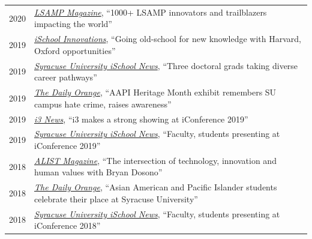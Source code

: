 \documentclass[12pt]{article}
\begin{document}
{\begin{longtable}{R{0.75in}p{5.0in}}
\footnotesize{2020} & \href{https://lsmrce.org/documents/community/LSAMP-Trailblazers-Magazine-2020.pdf}{\textit{LSAMP Magazine}}, ``1000+ LSAMP innovators and trailblazers impacting the world''\\

\footnotesize{2019} & \href{https://web.archive.org/web/20211124225929/https://issuu.com/ischoolsu/docs/su_ischool_innovations_18-19}{\textit{iSchool Innovations}}, ``Going old-school for new knowledge with Harvard, Oxford opportunities''\\

\footnotesize{2019} & \href{https://web.archive.org/web/20240724175744/https://ischool.syr.edu/three-doctoral-grads-taking-diverse-career-pathways-2019/}{\textit{Syracuse University iSchool News}}, ``Three doctoral grads taking diverse career pathways''\\

\footnotesize{2019} & \href{https://dailyorange.com/2019/04/aapi-heritage-month-exhibit-remembers-su-campus-hate-crime-raises-awareness/}{\textit{The Daily Orange}}, ``AAPI Heritage Month exhibit remembers SU campus hate crime, raises awareness''\\

\footnotesize{2019} & \href{https://www.i3-inclusion.org/news/i3-makes-a-strong-showing-at-iconference-2019/}{\textit{i3 News}}, ``i3 makes a strong showing at iConference 2019''\\

\footnotesize{2019} & \href{https://web.archive.org/web/20190329111213/https://ischool.syr.edu/articles/news/view/faculty-students-presenting-at-iconference-2019/}{\textit{Syracuse University iSchool News}}, ``Faculty, students presenting at iConference 2019''\\

\footnotesize{2018} & \href{https://web.archive.org/web/20190324053041/https://issuu.com/alist_magazine/docs/alist_summer_2018_final}{\textit{ALIST Magazine}}, ``The intersection of technology, innovation and human values with Bryan Dosono''\\

\footnotesize{2018} & \href{https://dailyorange.com/2018/04/asian-american-pacific-islander-students-celebrate-place-syracuse-university/}{\textit{The Daily Orange}}, ``Asian American and Pacific Islander students celebrate their place at Syracuse University''\\

\footnotesize{2018} & \href{https://web.archive.org/web/20240222194658/https://ischool.syr.edu/faculty-students-presenting-iconference-2018/}{\textit{Syracuse University iSchool News}}, ``Faculty, students presenting at iConference 2018''\\


\end{longtable}}
\end{document}
